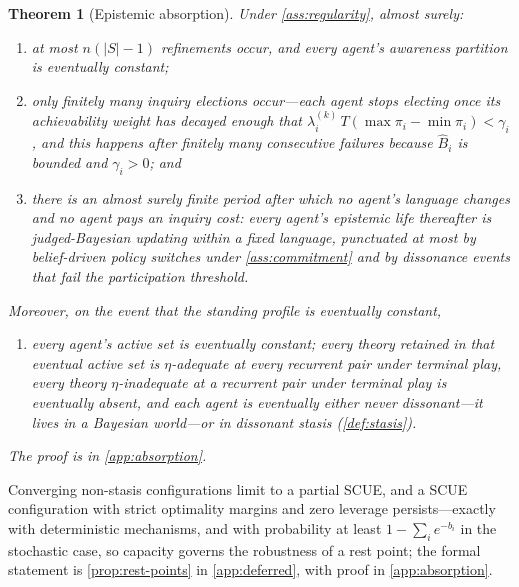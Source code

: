 \documentclass[11pt]{article}
\newtheorem{theorem}[assumption]{Theorem}
\theoremstyle{definition}
\begin{document}
\begin{theorem}[Epistemic absorption]
\label{thm:absorption}
Under \cref{ass:regularity}, almost surely:
\begin{enumerate}[label=(\alph*)]
  \item at most $n(|S|-1)$ refinements occur, and every agent's awareness partition is eventually constant;
  \item only finitely many inquiry elections occur---each agent stops electing once its achievability weight has decayed enough that $\lambda_i^{(k)}\,T(\max \pi_i-\min \pi_i)<\gamma_i$, and this happens after finitely many consecutive failures because $\widehat B_i$ is bounded and $\gamma_i>0$; and
  \item there is an almost surely finite period after which no agent's language changes and no agent pays an inquiry cost: every agent's epistemic life thereafter is judged-Bayesian updating within a fixed language, punctuated at most by belief-driven policy switches under \cref{ass:commitment} and by dissonance events that fail the participation threshold.
\end{enumerate}
Moreover, on the event that the standing profile is eventually constant,
\begin{enumerate}[label=(\alph*),start=4]
  \item every agent's active set is eventually constant; every theory retained in that eventual active set is $\eta$-adequate at every recurrent pair under terminal play, every theory $\eta$-inadequate at a recurrent pair under terminal play is eventually absent, and each agent is eventually either never dissonant---it lives in a Bayesian world---or in dissonant stasis (\cref{def:stasis}).
\end{enumerate}
The proof is in \cref{app:absorption}.
\end{theorem}

Converging non-stasis configurations limit to a partial SCUE, and a SCUE configuration with strict optimality margins and zero leverage persists---exactly with deterministic mechanisms, and with probability at least $1-\sum_i e^{-b_i}$ in the stochastic case, so capacity governs the robustness of a rest point; the formal statement is \cref{prop:rest-points} in \cref{app:deferred}, with proof in \cref{app:absorption}.
\end{document}
